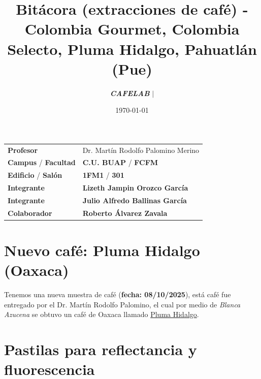 \documentclass{article}
\title{\textbf{Bitácora} (extracciones de café) - \textcolor{Apple Green}{\textbf{Colombia Gourmet}}, \textcolor{Tarawera}{\textbf{Colombia Selecto}}, \textcolor{Cinnabar}{\textbf{Pluma Hidalgo}}, \textcolor{Sun}{\textbf{Pahuatlán (Pue)}} }
\author{\emph{\textbf{CAFELAB}} $\boldsymbol{\mid}$}
\date{\today}
\begin{document}
\maketitle



\begin{mybox}
  \noindent\begin{tabular}{@{}ll}
    {\bfseries{Profesor}} & Dr. Martín Rodolfo Palomino Merino\\
    \textcolor{prussianblue}{\bfseries{Campus}} / \textcolor{trueblue}{\bfseries{Facultad}}  & \textcolor{prussianblue}{\bfseries{C.U. BUAP}} /  \textcolor{trueblue}{\bfseries{FCFM}} \\
    \textcolor{prussianblue}{\bfseries{Edificio}} /  \textcolor{trueblue}{\bfseries{Salón}}    &   \textcolor{prussianblue}{\bfseries{1FM1}} /  \textcolor{trueblue}{\bfseries{301}} \\
    \textcolor{prussianblue}{\bfseries{Integrante}} & \textbf{Lizeth Jampin Orozco García} \\
    \textcolor{prussianblue}{\bfseries{Integrante}} & \textbf{Julio Alfredo Ballinas García} \\
    \textcolor{prussianblue}{\bfseries{Colaborador}} & \textbf{Roberto Álvarez Zavala}
  \end{tabular}
\end{mybox}\vspace{1cm}





\vspace{2cm}
\hypersetup{linkcolor=black}
\tableofcontents
\hypersetup{linkcolor=Cerulean}
 \vspace{2cm}

\section{Nuevo café: Pluma Hidalgo (Oaxaca)}

Tenemos una nueva muestra de café (\textbf{fecha: 08/10/2025}), está café fue entregado por el Dr. Martín Rodolfo Palomino, el cual por medio de \emph{Blanca Azucena} se obtuvo un café de Oaxaca llamado \underline{Pluma Hidalgo}.

\section{Pastilas para \textcolor{orange(colorwheel)}{\textbf{reflectancia}} y \textcolor{Cerulean}{\textbf{fluorescencia}}}
\end{document}
